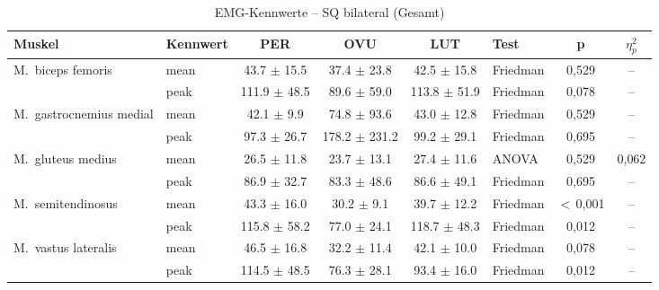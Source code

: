 \begin{table}[H]
  \centering
  \caption{EMG-Kennwerte – SQ bilateral (Gesamt)}
  \label{tab:SQ_bilateral_Gesamt}
  \small
  \begin{tabular}{l l c c c l c c}
    \hline
    \textbf{Muskel} & \textbf{Kennwert} & \textbf{PER} & \textbf{OVU} & \textbf{LUT} & \textbf{Test} & \textbf{p} & \textbf{$\eta^2_p$} \\
    \hline
    M.~biceps femoris & mean & 43.7 $\pm$ 15.5 & 37.4 $\pm$ 23.8 & 42.5 $\pm$ 15.8 & Friedman & 0{,}529 & -- \\
     & peak & 111.9 $\pm$ 48.5 & 89.6 $\pm$ 59.0 & 113.8 $\pm$ 51.9 & Friedman & 0{,}078 & -- \\
    \hline
    M.~gastrocnemius medial & mean & 42.1 $\pm$ 9.9 & 74.8 $\pm$ 93.6 & 43.0 $\pm$ 12.8 & Friedman & 0{,}529 & -- \\
     & peak & 97.3 $\pm$ 26.7 & 178.2 $\pm$ 231.2 & 99.2 $\pm$ 29.1 & Friedman & 0{,}695 & -- \\
    \hline
    M.~gluteus medius & mean & 26.5 $\pm$ 11.8 & 23.7 $\pm$ 13.1 & 27.4 $\pm$ 11.6 & ANOVA & 0{,}529 & 0{,}062 \\
     & peak & 86.9 $\pm$ 32.7 & 83.3 $\pm$ 48.6 & 86.6 $\pm$ 49.1 & Friedman & 0{,}695 & -- \\
    \hline
    M.~semitendinosus & mean & 43.3 $\pm$ 16.0 & 30.2 $\pm$ 9.1 & 39.7 $\pm$ 12.2 & Friedman & $<$\,0{,}001 & -- \\
     & peak & 115.8 $\pm$ 58.2 & 77.0 $\pm$ 24.1 & 118.7 $\pm$ 48.3 & Friedman & 0{,}012 & -- \\
    \hline
    M.~vastus lateralis & mean & 46.5 $\pm$ 16.8 & 32.2 $\pm$ 11.4 & 42.1 $\pm$ 10.0 & Friedman & 0{,}078 & -- \\
     & peak & 114.5 $\pm$ 48.5 & 76.3 $\pm$ 28.1 & 93.4 $\pm$ 16.0 & Friedman & 0{,}012 & -- \\
    \hline
  \end{tabular}
\end{table}

